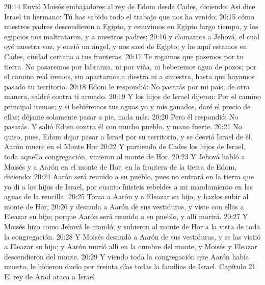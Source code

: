 20:14 Envió Moisés embajadores al rey de Edom desde Cades, diciendo: Así dice Israel tu hermano: Tú has sabido todo el trabajo que nos ha venido;  
20:15 cómo nuestros padres descendieron a Egipto, y estuvimos en Egipto largo tiempo, y los egipcios nos maltrataron, y a nuestros padres;  
20:16 y clamamos a Jehová, el cual oyó nuestra voz, y envió un ángel, y nos sacó de Egipto; y he aquí estamos en Cades, ciudad cercana a tus fronteras.  
20:17 Te rogamos que pasemos por tu tierra. No pasaremos por labranza, ni por viña, ni beberemos agua de pozos; por el camino real iremos, sin apartarnos a diestra ni a siniestra, hasta que hayamos pasado tu territorio.  
20:18 Edom le respondió: No pasarás por mi país; de otra manera, saldré contra ti armado.  
20:19 Y los hijos de Israel dijeron: Por el camino principal iremos; y si bebiéremos tus aguas yo y mis ganados, daré el precio de ellas; déjame solamente pasar a pie, nada más.  
20:20 Pero él respondió: No pasarás. Y salió Edom contra él con mucho pueblo, y mano fuerte.  
20:21 No quiso, pues, Edom dejar pasar a Israel por su territorio, y se desvió Israel de él.  
Aarón muere en el Monte Hor  
20:22 Y partiendo de Cades los hijos de Israel, toda aquella congregación, vinieron al monte de Hor.  
20:23 Y Jehová habló a Moisés y a Aarón en el monte de Hor, en la frontera de la tierra de Edom, diciendo:  
20:24 Aarón será reunido a su pueblo, pues no entrará en la tierra que yo di a los hijos de Israel, por cuanto fuisteis rebeldes a mi mandamiento en las aguas de la rencilla.  
20:25 Toma a Aarón y a Eleazar su hijo, y hazlos subir al monte de Hor,  
20:26 y desnuda a Aarón de sus vestiduras, y viste con ellas a Eleazar su hijo; porque Aarón será reunido a su pueblo, y allí morirá.  
20:27 Y Moisés hizo como Jehová le mandó; y subieron al monte de Hor a la vista de toda la congregación.  
20:28 Y Moisés desnudó a Aarón de sus vestiduras, y se las vistió a Eleazar su hijo; y Aarón murió allí en la cumbre del monte, y Moisés y Eleazar descendieron del monte.  
20:29 Y viendo toda la congregación que Aarón había muerto, le hicieron duelo por treinta días todas la familias de Israel.  
Capítulo 21 
El rey de Arad ataca a Israel  


